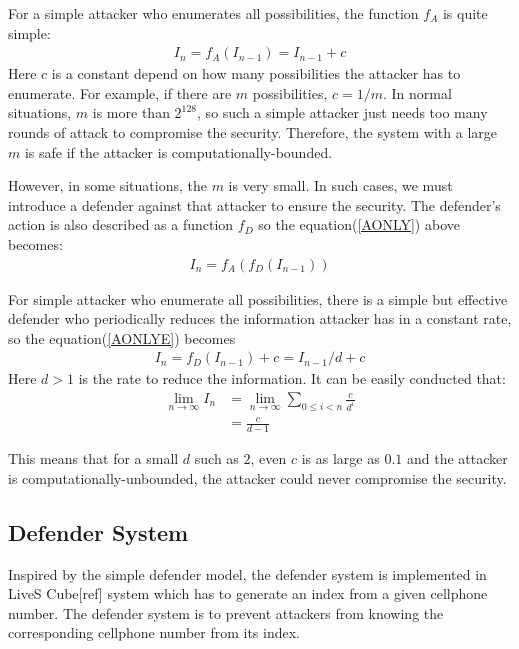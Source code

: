 \documentclass[10pt,a4paper]{article}
\begin{document}
		For a simple attacker who enumerates all possibilities, the
		function $f_A$ is quite simple:
		\begin{align}
			I_n = f_A(I_{n-1}) = I_{n-1}+c\label{AONLYE}
		\end{align}
		Here $c$ is a constant depend on how many possibilities the
		attacker has to enumerate. For example, if there are
		$m$ possibilities, $c = 1/m$. In normal situations, $m$ is more
		than $2^{128}$, so such a simple attacker just needs too many rounds
		of attack to compromise the security. Therefore, the system with
		a large $m$ is safe if the attacker is computationally-bounded.
		
		However, in some situations, the $m$ is very small. In such cases,
		we must introduce a defender against that attacker to ensure the
		security. The defender's action is also described as a function $f_D$
		so the equation(\ref{AONLY}) above becomes:
		\begin{align}
			I_n = f_A(f_D(I_{n-1}))
		\end{align}
		
		For simple attacker who enumerate all possibilities,
		there is a simple but effective defender 
		who periodically reduces the information 
		attacker has in a constant rate, so
		the equation(\ref{AONLYE}) becomes
		\begin{align}
			I_n = f_D(I_{n-1})+c = I_{n-1}/d+c
		\end{align}
		Here $d > 1$ is the rate to reduce the information.
		It can be easily conducted that:
		\begin{align*}
			\lim_{n \rightarrow \infty} I_n &= \lim_{n \rightarrow \infty} \sum_{0 \leq i < n} \frac{c}{d^i}\\
				&= \frac{c}{d-1}
		\end{align*}
		
		This means that for a small $d$ such as $2$, even $c$ is as large as
		$0.1$ and the attacker is computationally-unbounded, the attacker
		could never compromise the security.
		
	\subsection{Defender System}\label{sec_ds}
		Inspired by the simple defender model, the defender system is implemented
		in LiveS Cube[ref] system which has to generate an index
		from a given cellphone number. The defender system is to prevent attackers
		from knowing the corresponding cellphone number from its index.
		
\end{document}
